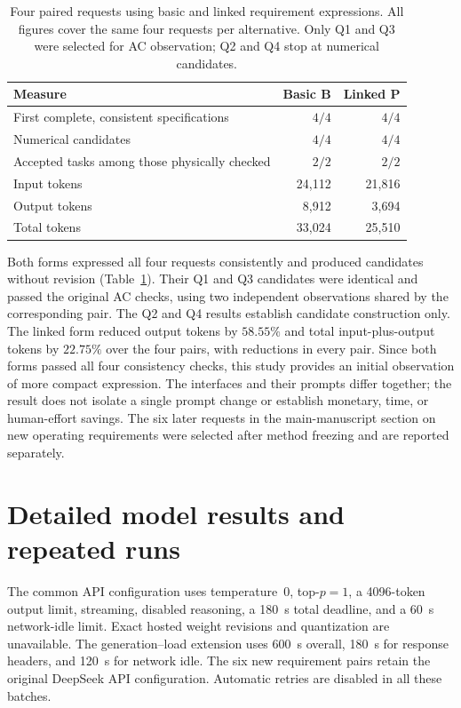 \begin{table}[t]
\caption{Four paired requests using basic and linked requirement expressions. All figures cover the same four requests per alternative. Only Q1 and Q3 were selected for AC observation; Q2 and Q4 stop at numerical candidates.}
\label{tab:compact-expression}
\small
\begin{tabularx}{\linewidth}{@{}Xrr@{}}
\toprule
Measure & Basic B & Linked P \\
\midrule
First complete, consistent specifications & $4/4$ & $4/4$ \\
Numerical candidates & $4/4$ & $4/4$ \\
Accepted tasks among those physically checked & $2/2$ & $2/2$ \\
Input tokens & 24,112 & 21,816 \\
Output tokens & 8,912 & 3,694 \\
Total tokens & 33,024 & 25,510 \\
\bottomrule
\end{tabularx}
\end{table}

Both forms expressed all four requests consistently and produced candidates without revision (Table~\ref{tab:compact-expression}). Their Q1 and Q3 candidates were identical and passed the original AC checks, using two independent observations shared by the corresponding pair. The Q2 and Q4 results establish candidate construction only. The linked form reduced output tokens by $58.55\%$ and total input-plus-output tokens by $22.75\%$ over the four pairs, with reductions in every pair. Since both forms passed all four consistency checks, this study provides an initial observation of more compact expression. The interfaces and their prompts differ together; the result does not isolate a single prompt change or establish monetary, time, or human-effort savings. The six later requests in the main-manuscript section on new operating requirements were selected after method freezing and are reported separately.


\section{Detailed model results and repeated runs}
\label{app:model-details}

The common API configuration uses temperature~0, top-$p=1$, a 4096-token output limit, streaming, disabled reasoning, a 180~s total deadline, and a 60~s network-idle limit. Exact hosted weight revisions and quantization are unavailable. The generation--load extension uses 600~s overall, 180~s for response headers, and 120~s for network idle. The six new requirement pairs retain the original DeepSeek API configuration. Automatic retries are disabled in all these batches.

